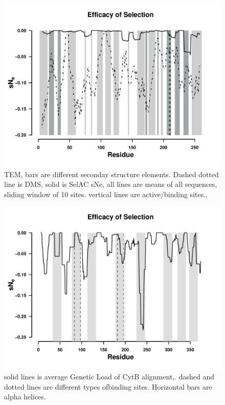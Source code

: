 \documentclass[12pt]{article}
\begin{document}
\begin{figure}[H]
     \centering
	\includegraphics[width=\textwidth]{img/sNe_slide_TEM2016}
	\caption{TEM, bars are different seconday structure elements. Dashed dotted line is DMS, solid is SelAC sNe, all lines are means of all sequences, sliding window of 10 sites. vertical lines are active/binding sites.,}
	\label{fig:tem2016_sse}
\end{figure}

\begin{figure}[H]
     \centering
	\includegraphics[width=\textwidth]{img/sNe_slide_whale}
	\caption{solid lines is average Genetic Load of CytB alignment,. dashed and dotted lines are different types ofbinding sites. Horizontal bars are alpha helices.}
	\label{fig:whale_sse}
\end{figure}
\end{document}
